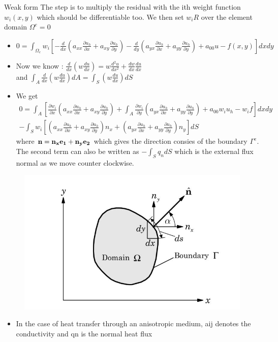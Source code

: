 	\begin{frame}{Weak form}
		The step is to multiply the residual with the ith weight function $w_i(x,y)$ which should be differentiable too. We then set $w_iR$ over the element domain $\Omega^e = 0$
		\begin{itemize}
			\item $0 = \int_{\Omega_e} w_i \left[ 
			-\frac{d}{dx}\left(a_{xx} \frac{\partial u_h}{\partial x} + a_{xy} \frac{\partial u_h}{\partial y} \right)
			-\frac{d}{dy}\left(a_{yx} \frac{\partial u_h}{\partial x} + a_{yy} \frac{\partial u_h}{\partial y} \right) + a_{00} u - f(x,y) \right] dxdy$
			\item Now we know : $\frac{d}{dx}\left(w \frac{du}{dx}\right) = w\frac{d^2u}{dx^2} + \frac{dw}{dx}\frac{du}{dx}$ \\ and $\int_A \frac{d}{dx}\left(w \frac{du}{dx} \right) dA= \int_S \left(w \frac{du}{dx} \right) dS$
			\item We get 
			\begin{equation}
			\begin{aligned}
			0 = \int_A \left[\frac{\partial w_i}{\partial x} \left(a_{xx} \frac{\partial u_h}{\partial x } + a_{xy} \frac{\partial u_h}{\partial y }\right) + 
			\int_A \frac{\partial w_i}{\partial y} \left(a_{yx} \frac{\partial u_h}{\partial x } + a_{yy} \frac{\partial u_h}{\partial y }\right) + a_{00}w_iu_h - w_if \right]dxdy \\
			- \int_S w_i \left[ \left(a_{xx} \frac{\partial u_h}{\partial x} + a_{xy} \frac{\partial u_h}{\partial y} \right)n_x + \left(a_{yx} \frac{\partial u_h}{\partial x} + a_{yy} \frac{\partial u_h}{\partial y} \right)n_y \right]dS
			\end{aligned}
			\end{equation}
			where $\mathbf{n = n_xe_1 + n_ye_2}$ which gives the direction consies of the boundary $\Gamma^e$. The second term can also be written as $-\int_S q_n dS$ which is the external flux normal as we move counter clockwise. 
		\end{itemize}
	\end{frame}


	\begin{frame}
		\begin{figure}
			\centering
			\includegraphics[width=0.5 \linewidth]{Figure/fig25} 		
		\end{figure}
	\begin{itemize}
		\item In the case of heat transfer through an anisotropic medium, aij denotes the conductivity and qn is the normal heat flux
		
	\end{itemize}
	\end{frame}


